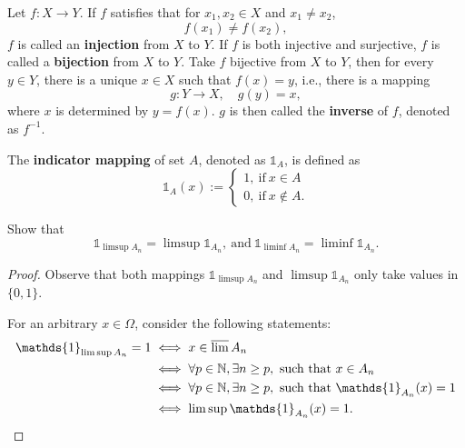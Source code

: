 \documentclass[11pt,singlecolumn, openany, citestyle=authoryear]{elegantbook}
\begin{document}
\begin{CJK}{UTF8}{gbsn}
    \begin{definition}
        Let $f:X \to Y$. If $f$ satisfies that for $x_1,x_2\in X$ and $x_1\neq x_2$,
        $$
        f(x_1)\neq f(x_2),
        $$
        $f$ is called an \textbf{injection} from $X$ to $Y$. If $f$ is both injective and 
        surjective, $f$ is called a \textbf{bijection} from $X$ to $Y$. Take $f$ bijective
        from $X$ to $Y$, then for every $y \in Y$, there is a unique $x \in X$ such that 
        $f(x)=y$, i.e., there is a mapping 
        $$
        g:Y \to X, \quad g(y)=x,
        $$
        where $x$ is determined by $y=f(x)$. $g$ is then called the \textbf{inverse} of 
        $f$, denoted as $f^{-1}$.
    \end{definition}
    
    \begin{definition}
        The \textbf{indicator mapping} of set $A$, denoted as $\mathds{1}_A$, is defined as 
        \begin{equation}
            \mathds{1}_A(x) :=
            \begin{cases}
                1,\ \text{if}\ x \in A \\
                0,\ \text{if}\ x \notin A.
            \end{cases}
        \end{equation}
    \end{definition}
    
    \begin{example}
        Show that
        $$
        \mathds{1}_{\limsup A_n} = \limsup \mathds{1}_{A_n}, \ \text{and} \ 
        \mathds{1}_{\liminf A_n} = \liminf \mathds{1}_{A_n}.
        $$
    \end{example}
    \begin{proof}
        Observe that both mappings $\mathds{1}_{\limsup A_n}$ and $\limsup \mathds{1}_{A_n}$
        only take values in $\{0,1\}$.
    
        For an arbitrary $x \in \Omega$, consider the following statements:
        \begin{align*}
            \mathds{1}_{\limsup A_n} = 1 &\iff x \in \varlimsup A_n\\
            &\iff \forall p \in \mathbb{N}, \exists n \geq p, \ \text{such that}\ 
            x \in A_n \\
            &\iff \forall p \in \mathbb{N}, \exists n \geq p, \ \text{such that}\ 
            \mathds{1}_{A_n}(x) = 1\\
            &\iff \limsup \mathds{1}_{A_n}(x) = 1.
        \end{align*}
    \end{proof}
    

\end{CJK}
\end{document}
